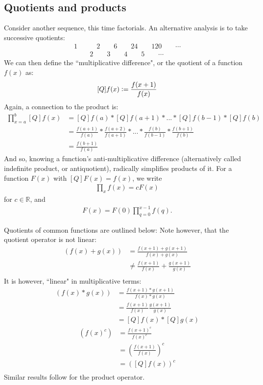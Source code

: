 \documentclass{article}
\renewcommand\({\left(}
\renewcommand\){\right)}
\begin{document}
\subsection{Quotients and products}
Consider another sequence, this time factorials. An alternative analysis is to take successive quotients:
\begin{align*}
1\quad&\quad2\quad\quad6\quad\quad24\quad\quad120\quad\quad \cdots\\
&2\quad\quad3\quad\quad4\quad\quad5\quad\quad \cdots
\end{align*}
We can then define the ``multiplicative difference", or the quotient of a function $f(x)$ as:
\[[Q]f(x)\vcentcolon=\frac{f(x+1)}{f(x)}\]
Again, a connection to the product is:
\begin{align*}
    \prod_{x=a}^{b} [Q]f(x)&=[Q]f(a)*[Q]f(a+1)*...*[Q]f(b-1)*[Q]f(b)\\
    &=\frac{f(a+1)}{f(a)}*\frac{f(a+2)}{f(a+1)}*...*\frac{f(b)}{f(b-1)}*\frac{f(b+1)}{f(b)}\\
    &=\frac{f(b+1)}{f(a)}
\end{align*}
And so, knowing a function's anti-multiplicative difference (alternatively called indefinite product, or antiquotient), radically simplifies products of it. For a function $F(x)$ with $[Q]F(x)=f(x)$, we write
\begin{align*}
    \prod_{x}f(x)=cF(x)
\end{align*}
for $c\in\mathbb{R}$, and
\begin{align*}
    F(x)=F(0)\prod_{q=0}^{x-1}f(q).
\end{align*}

\vspace{6mm}
Quotients of common functions are outlined below:
Note however, that the quotient operator is not linear:
\begin{align*}
    [Q]\left(f(x)+g(x)\right)&=\frac{f(x+1)+g(x+1)}{f(x)+g(x)}\\
    &\not=\frac{f(x+1)}{f(x)}+\frac{g(x+1)}{g(x)}\\
\end{align*}
It is however, ``linear" in multiplicative terms:
\begin{align*}
    [Q]\left(f(x)*g(x)\right)&=\frac{f(x+1)*g(x+1)}{f(x)*g(x)}\\
    &=\frac{f(x+1)}{f(x)}\frac{g(x+1)}{g(x)}\\
    &=[Q]f(x)*[Q]g(x)
\end{align*}
\begin{align*}
    [Q]\left(f(x)^c\right)&=\frac{f(x+1)^c}{f(x)^c}\\
    &=\left(\frac{f(x+1)}{f(x)}\right)^c\\
    &=\left([Q]f(x)\right)^c\\
\end{align*}
Similar results follow for the product operator.
\end{document}

